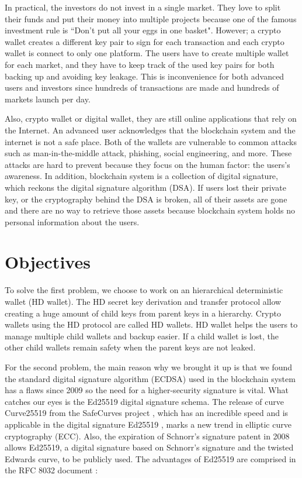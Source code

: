 In practical, the investors do not invest in a single market. They love to split their funds and put their money into multiple projects because one of the famous investment rule is ``Don’t put all your eggs in one basket". However; a crypto wallet creates a different key pair to sign for each transaction and each crypto wallet is connect to only one platform. The users have to create multiple wallet for each market, and they have to keep track of the used key pairs for both backing up and avoiding key leakage. This is inconvenience for both advanced users and investors since hundreds of transactions are made and hundreds of markets launch per day.

Also, crypto wallet or digital wallet, they are still online applications that rely on the Internet. An advanced user acknowledges that the blockchain system and the internet is not a safe place. Both of the wallets are vulnerable to common attacks such as man-in-the-middle attack, phishing, social engineering, and more. These attacks are hard to prevent because they focus on the human factor: the users’s awareness. In addition, blockchain system is a collection of digital signature, which reckons the digital signature algorithm (DSA). If users lost their private key, or the cryptography behind the DSA is broken, all of their assets are gone and there are no way to retrieve those assets because blockchain system holds no personal information about the users.

\section{Objectives}
\label{objectives}

To solve the first problem, we choose to work on an hierarchical deterministic wallet (HD wallet). The HD secret key derivation and transfer protocol allow creating a huge amount of child keys from parent keys in a hierarchy. Crypto wallets using the HD protocol are called HD wallets. HD wallet helps the users to manage multiple child wallets and backup easier. If a child wallet is lost, the other child wallets remain safety when the parent keys are not leaked.

For the second problem, the main reason why we brought it up is that we found the standard digital signature algorithm (ECDSA) used in the blockchain system has a flaws since 2009 \cite{Schmidt2009} so the need for a higher-security signature is vital. What catches our eyes is the Ed25519 digital signature schema. The release of curve Curve25519 \cite{Bernstein2006} from the SafeCurves project \cite{safecurves}, which has an incredible speed and is applicable in the digital signature Ed25519 \cite{Bernstein2011}, marks a new trend in elliptic curve cryptography (ECC). Also, the expiration of Schnorr’s signature patent in 2008 allows Ed25519, a digital signature based on Schnorr’s signature and the twisted Edwards curve, to be publicly used. The advantages of Ed25519 are comprised in the RFC 8032 document \cite{Josefsson2017}:

